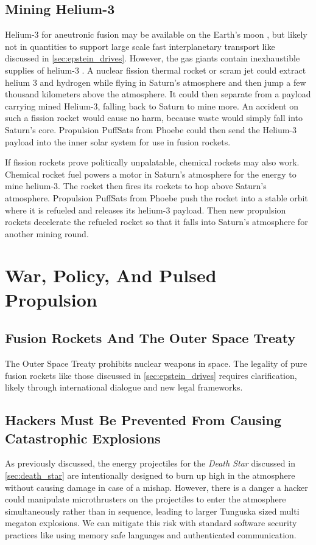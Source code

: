 \documentclass{article}
\begin{document}
\subsection{Mining Helium-3} \label{sec:mining_helium_3}
Helium-3 for aneutronic fusion may be available on the Earth's moon \cite{esa_helium3_mining}, but likely not in quantities to support large scale fast interplanetary transport like discussed in \autoref{sec:epstein_drives}.   However, the gas giants contain inexhaustible supplies of helium-3 \cite{palaszewski2005atmospheric}.   A nuclear fission thermal rocket or scram jet could extract helium 3 and hydrogen while flying in Saturn's atmosphere and then jump a few thousand kilometers above the atmosphere.  It could then separate from a payload carrying mined Helium-3, falling back to Saturn to mine more.  An accident on such a fission rocket would cause no harm, because waste would simply fall into Saturn's core. Propulsion PuffSats from Phoebe could then send the Helium-3 payload into the inner solar system for use in fusion rockets.  

If fission rockets prove politically unpalatable, chemical rockets may also work.   Chemical rocket fuel powers a motor in Saturn's atmosphere for the energy to mine helium-3.  The rocket then fires its rockets to hop above Saturn's atmosphere.   Propulsion PuffSats from Phoebe push the rocket into a stable orbit where it is refueled and releases its helium-3 payload.  Then new propulsion rockets decelerate the refueled rocket so that it falls into Saturn's atmosphere for another mining round.


\section{War, Policy, And Pulsed Propulsion}
\subsection{Fusion Rockets And The Outer Space Treaty}
The Outer Space Treaty \cite{outer_space_treaty} prohibits nuclear weapons in space. The legality of pure fusion rockets like those discussed in \autoref{sec:epstein_drives} requires clarification, likely through international dialogue and new legal frameworks.

\subsection{Hackers Must Be Prevented From Causing Catastrophic Explosions}
As previously discussed, the energy projectiles for the \textit{Death Star} discussed in \autoref{sec:death_star} are intentionally designed to burn up high in the atmosphere without causing damage in case of a mishap.  However, there is a danger a hacker could manipulate microthrusters on the projectiles to enter the atmosphere simultaneously rather than in sequence, leading to larger Tunguska \cite{longo2007tunguska} sized multi megaton explosions.  We can mitigate this risk with standard software security practices like using memory safe languages and authenticated communication.
\end{document}
